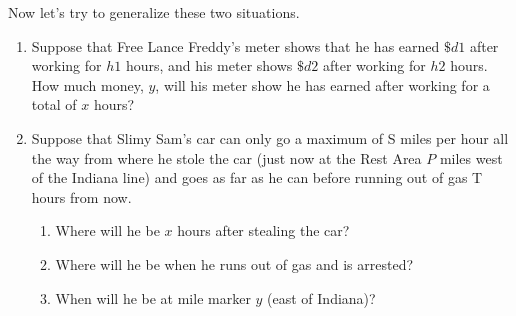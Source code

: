 \documentclass{ximera}
\begin{document}
\begin{problem}
Now let's try to generalize these two situations.
\begin{enumerate}
    \item Suppose that Free Lance Freddy's meter shows that he has earned $\$d1 $ after working for $h1$ hours, and his meter shows $\$d2 $ after working for $h2 $ hours. How much money, $y$, will his meter show he has earned after working for a total of $x$ hours?
    \item Suppose that Slimy Sam's car can only go a maximum of S miles per hour all the way from where he stole the car (just now at the Rest Area $P$ miles west of the Indiana line) and goes as far as he can before running out of gas T hours from now.
\begin{enumerate}[label=(\roman*)]
 \item Where will he be $x$ hours after stealing the car?
 \item Where will he be when he runs out of gas and is arrested?
 \item  When will he be at mile marker $y$ (east of Indiana)?
\end{enumerate}

\end{enumerate}



\end{problem}


\newpage
\end{document}
